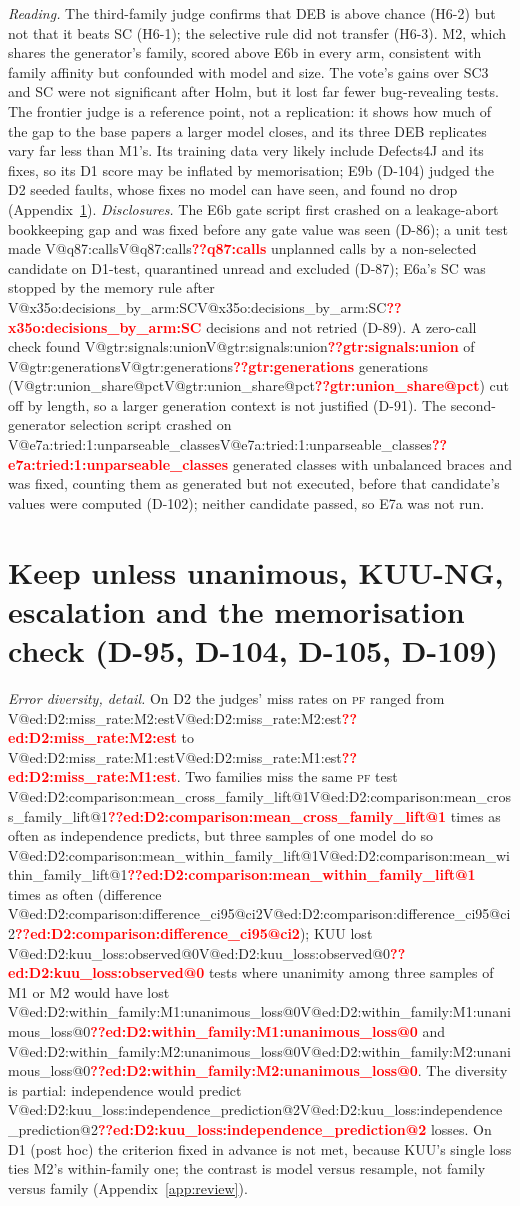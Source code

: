 \documentclass[pdflatex,iicol,sn-mathphys-num]{sn-jnl}
\makeatletter
\newcommand{\V}[1]{\ifcsname V@#1\endcsname\csname V@#1\endcsname\else\textbf{\textcolor{red}{??#1}}\fi}
\newcommand{\PF}{\textsc{pf}}
\makeatother
\begin{document}
\begin{appendices}
\noindent\textit{Reading.} The third-family judge confirms that DEB is above chance (H6-2) but not that it beats SC (H6-1); the selective rule did not transfer (H6-3). M2, which shares the generator's family, scored above E6b in every arm, consistent with family affinity but confounded with model and size. The vote's gains over SC3 and SC were not significant after Holm, but it lost far fewer bug-revealing tests. The frontier judge is a reference point, not a replication: it shows how much of the gap to the base papers a larger model closes, and its three DEB replicates vary far less than M1's. Its training data very likely include Defects4J and its fixes, so its D1 score may be inflated by memorisation; E9b (D-104) judged the D2 seeded faults, whose fixes no model can have seen, and found no drop (Appendix~\ref{app:cascade}). \textit{Disclosures.} The E6b gate script first crashed on a leakage-abort bookkeeping gap and was fixed before any gate value was seen (D-86); a unit test made \V{q87:calls} unplanned calls by a non-selected candidate on D1-test, quarantined unread and excluded (D-87); E6a's SC was stopped by the memory rule after \V{x35o:decisions_by_arm:SC} decisions and not retried (D-89). A zero-call check found \V{gtr:signals:union} of \V{gtr:generations} generations (\V{gtr:union_share@pct}) cut off by length, so a larger generation context is not justified (D-91). The second-generator selection script crashed on \V{e7a:tried:1:unparseable_classes} generated classes with unbalanced braces and was fixed, counting them as generated but not executed, before that candidate's values were computed (D-102); neither candidate passed, so E7a was not run.
\section{Keep unless unanimous, KUU-NG, escalation and the memorisation check (D-95, D-104, D-105, D-109)}\label{app:cascade}
\setcounter{table}{0}\setcounter{figure}{0}%

\noindent\textit{Error diversity, detail.} On D2 the judges' miss rates on \PF{} ranged from \V{ed:D2:miss_rate:M2:est} to \V{ed:D2:miss_rate:M1:est}. Two families miss the same \PF{} test \V{ed:D2:comparison:mean_cross_family_lift@1} times as often as independence predicts, but three samples of one model do so \V{ed:D2:comparison:mean_within_family_lift@1} times as often (difference \V{ed:D2:comparison:difference_ci95@ci2}); KUU lost \V{ed:D2:kuu_loss:observed@0} tests where unanimity among three samples of M1 or M2 would have lost \V{ed:D2:within_family:M1:unanimous_loss@0} and \V{ed:D2:within_family:M2:unanimous_loss@0}. The diversity is partial: independence would predict \V{ed:D2:kuu_loss:independence_prediction@2} losses. On D1 (post hoc) the criterion fixed in advance is not met, because KUU's single loss ties M2's within-family one; the contrast is model versus resample, not family versus family (Appendix~\ref{app:review}).



\end{appendices}
\end{document}
